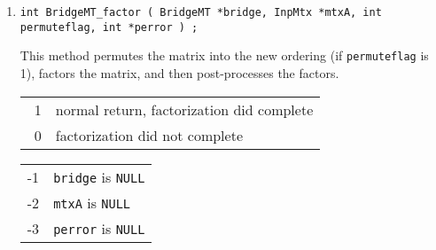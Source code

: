 \begin{enumerate}
\begin{center}
\end{center}
\item
\begin{verbatim}
int BridgeMT_factor ( BridgeMT *bridge, InpMtx *mtxA, int permuteflag, int *perror ) ;
\end{verbatim}
This method permutes the matrix into the new ordering (if
\texttt{permuteflag} is 1), factors the matrix, and then
post-processes the factors.
\par {}
\begin{center}
\begin{tabular}{ll}
~1 & normal return, factorization did complete \\
~0 & factorization did not complete \\
\end{tabular}
\begin{tabular}{ll}
-1 & \texttt{bridge} is \texttt{NULL} \\
-2 & \texttt{mtxA} is \texttt{NULL} \\
-3 & \texttt{perror} is \texttt{NULL} \\
\end{tabular}
\end{center}
\end{enumerate}
\par
